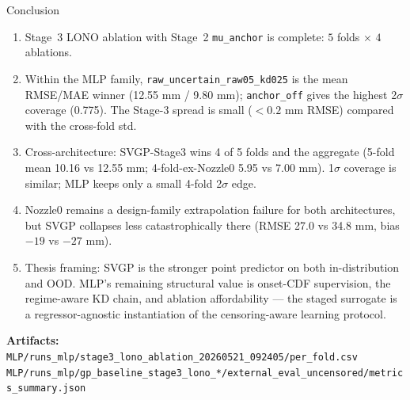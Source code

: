 \documentclass[UTF8,aspectratio=169]{ctexbeamer}
\begin{document}
\begin{frame}{Conclusion}
\small
\begin{enumerate}\setlength\itemsep{4pt}
  \item Stage~3 LONO ablation with Stage~2 \texttt{mu\_anchor} is complete:
        \(5\) folds \(\times\) \(4\) ablations.
  \item Within the MLP family, \texttt{raw\_uncertain\_raw05\_kd025} is the mean RMSE/MAE winner
        (12.55 mm / 9.80 mm); \texttt{anchor\_off} gives the highest 2\(\sigma\) coverage (0.775).
        The Stage-3 spread is small (\(<0.2\) mm RMSE) compared with the cross-fold std.
  \item Cross-architecture: SVGP-Stage3 wins 4 of 5 folds and the aggregate (5-fold mean
        10.16 vs 12.55 mm; 4-fold-ex-Nozzle0 5.95 vs 7.00 mm). 1\(\sigma\) coverage is similar;
        MLP keeps only a small 4-fold 2\(\sigma\) edge.
  \item Nozzle0 remains a design-family extrapolation failure for both architectures, but SVGP
        collapses less catastrophically there (RMSE 27.0 vs 34.8 mm, bias \(-19\) vs \(-27\) mm).
  \item Thesis framing: SVGP is the stronger point predictor on both in-distribution and OOD.
        MLP's remaining structural value is onset-CDF supervision, the regime-aware KD
        chain, and ablation affordability --- the staged surrogate is a regressor-agnostic
        instantiation of the censoring-aware learning protocol.
\end{enumerate}

\vspace{0.3em}
\textbf{Artifacts:}\\
\scriptsize
\texttt{MLP/runs\_mlp/stage3\_lono\_ablation\_20260521\_092405/per\_fold.csv}\\
\texttt{MLP/runs\_mlp/gp\_baseline\_stage3\_lono\_*/external\_eval\_uncensored/metrics\_summary.json}
\end{frame}
\end{document}
